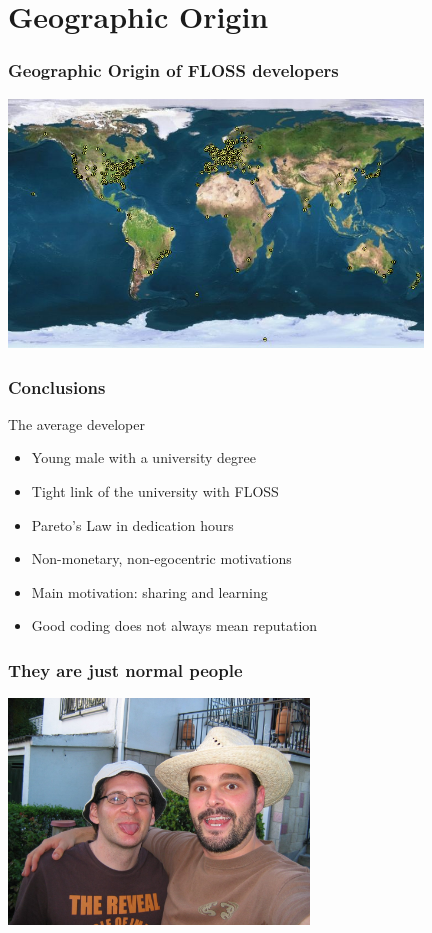 \documentclass{beamer}
\begin{document}
\section{Geographic Origin}

\begin{frame}
\frametitle{Geographic Origin of FLOSS developers}

\begin{center}
\includegraphics[width=11cm]{figs/developers-map.jpg}
\end{center}

\end{frame}

\begin{frame}
\frametitle{Conclusions}

The average developer

\begin{itemize}
\item Young male with a university degree
\item Tight link of the university with FLOSS
\item Pareto's Law in dedication hours
\item Non-monetary, non-egocentric motivations
\item Main motivation: sharing and learning
\item Good coding does not always mean reputation
\end{itemize}
\end{frame}

\begin{frame}
\frametitle{They are just normal people}

\begin{center}
\includegraphics[width=8cm]{figs/martin.jpg}
\end{center}

\end{frame}
\end{document}

